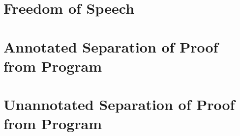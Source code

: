 \documentclass[phd,appendix,dedicationpage,ackpage,epigraphpage]{uithesis}
\begin{document}
\newpage
\section{Freedom of Speech}
\label{sec:freedom_of_speech_all}
\FSall{}

\newpage
\section{Annotated Separation of Proof from Program}
\label{sec:annotated_separation_of_proof_from_program}
\Sepall{}

\newpage
\section{Unannotated Separation of Proof from Program}
\label{sec:unannotated_separation_of_proof_from_program}
\SepUall{}
\end{document}
